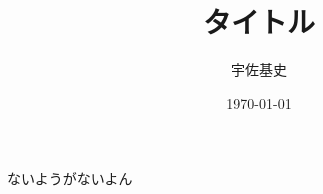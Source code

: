 \documentclass[a4paper,11pt]{jsarticle}
\begin{document}
\title{タイトル}
\author{宇佐基史}
\date{\today}
\maketitle
ないようがないよん
\end{document}

